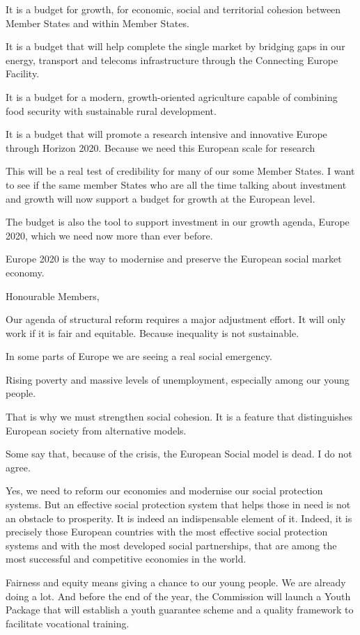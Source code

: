 \documentclass[a4paper,11pt]{article}
\begin{document}
It is a budget for growth, for economic, social and territorial cohesion between Member States and within Member States.

It is a budget that will help complete the single market by bridging gaps in our energy, transport and telecoms infrastructure through the Connecting Europe Facility.

It is a budget for a modern, growth-oriented agriculture capable of combining food security with sustainable rural development.

It is a budget that will promote a research intensive and innovative Europe through Horizon 2020. Because we need this European scale for research

This will be a real test of credibility for many of our some Member States. I want to see if the same member States who are all the time talking about investment and growth will now support a budget for growth at the European level.

The budget is also the tool to support investment in our growth agenda, Europe 2020, which we need now more than ever before.

Europe 2020 is the way to modernise and preserve the European social market economy.

Honourable Members,

Our agenda of structural reform requires a major adjustment effort. It will only work if it is fair and equitable. Because inequality is not sustainable.

In some parts of Europe we are seeing a real social emergency.

Rising poverty and massive levels of unemployment, especially among our young people.

That is why we must strengthen social cohesion. It is a feature that distinguishes European society from alternative models.

Some say that, because of the crisis, the European Social model is dead. I do not agree.

Yes, we need to reform our economies and modernise our social protection systems. But an effective social protection system that helps those in need is not an obstacle to prosperity. It is indeed an indispensable element of it. Indeed, it is precisely those European countries with the most effective social protection systems and with the most developed social partnerships, that are among the most successful and competitive economies in the world.

Fairness and equity means giving a chance to our young people. We are already doing a lot. And before the end of the year, the Commission will launch a Youth Package that will establish a youth guarantee scheme and a quality framework to facilitate vocational training.
\end{document}
